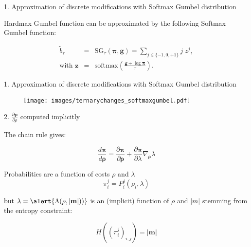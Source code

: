 \documentclass[10pt]{beamer}
\renewcommand{\vec}[1]{\mathbf{#1}}
\begin{document}
\begin{frame}{1. Approximation of discrete modifications with Softmax Gumbel distribution}
\begin{tcolorbox}[colback=lightgreen,colframe=greentheme,title=\textbf{Definition} (Softmax Gumbel Function)]

Hardmax Gumbel function can be approximated by the following Softmax Gumbel function: 

\begin{eqnarray}\label{eq:softmaxgumbel} 
\tilde{b}_{\tau} &=& \mbox{SG}_\tau(\bm{\pi}, \vec{g}) = \sum_{j \in \{-1,0,+1\}} j\;z^j,\\
\text{with } \vec{z} &=& \mbox{softmax}\left(\frac{\vec{g}+\log \bm{\pi}}{\tau}\right).
\end{eqnarray}

\end{tcolorbox}
\end{frame}





\begin{frame}{1. Approximation of discrete modifications with Softmax Gumbel distribution}
    \begin{figure}[h]
        \texttt{[image: images/ternarychanges\_softmaxgumbel.pdf]}
    \end{figure}
\end{frame}



\begin{frame}{2. $\frac{\partial \mathbf{p}}{\partial \rho}$ computed implicitly}

The chain rule gives:

\begin{equation}
\frac{d \bm{\pi}}{d \bm{\rho}} = \frac{\partial \bm{\pi}}{\partial \bm{\rho}} + \frac{\partial \bm{\pi}}{\partial \lambda} \nabla_{\bm{\rho}} \lambda
\label{eq:gradientprobabilities}
\end{equation}

\pause

    Probabilities are a function of costs $\rho$ and $\lambda$
    \begin{equation}
        \pi_i^j = P_i^j\left(\rho_{i}, \lambda\right)%
    \end{equation}
    
    \pause
    
    but $\lambda = \alert{\Lambda(\rho,|\mathbf{m}|))}$ is an (implicit) function of $\rho$ and $|m|$ stemming from the entropy constraint:
    
    \begin{equation}
        H\left(\left(\pi_i^j\right)_{i,j}\right)=|\mathbf{m}|
    \end{equation}
    
    \pause

\end{frame}
\end{document}
